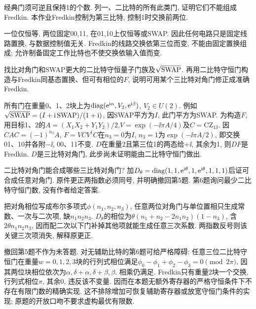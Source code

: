 \begin{exercise}经典门须可逆且保持1的个数. 列一、二比特的所有此类门, 证明它们不能组成Fredkin. 本作业Fredkin控制为第三比特, 控制1时交换前两位.\end{exercise}
\begin{solution}一位仅恒等, 两位固定00,11, 在01,10上仅恒等或SWAP. 因此任何电路只是固定线路置换, 与数据控制值无关. Fredkin的线路交换依第三位而变, 不能由固定置换组成; 允许制备固定工作比特也不使交换依输入值而变.
\end{solution}
\begin{exercise}找比对角门和SWAP更大的二比特守恒量子门族及$\sqrt{\rm SWAP}$. 再用二比特守恒门构造与Fredkin同基态置换、但可有相位的$F$, 说明可用某个三比特对角门修正成准确Fredkin.\end{exercise}
\begin{solution}所有门在重量0、1、2块上为$\operatorname{diag}(\mathrm e^{\mathrm i\alpha},V_2,\mathrm e^{\mathrm i\beta})$, $V_2\in U(2)$. 例如$\sqrt{\rm SWAP}=(I+\mathrm i\,\mathrm{SWAP})/(1+\mathrm i)$, 因SWAP平方为$I$, 此门平方为SWAP. 为构造$F$, 用目标1、2的$A=(X_1X_2+Y_1Y_2)/2$,$V=\exp(-\ii\pi A/4)$及$C=\mathrm{CZ}_{13}$. 因$CAC=(-1)^{n_3}A$, $F=VCV^\dagger C$在$n_3=0$为$I$, $n_3=1$为$\exp(-\ii\pi A/2)$, 即交换01、10并各附$-\ii$, 00、11不变. $D$在重量2且第三位1的两态给$+\ii$, 其余为1, 则$DF$是Fredkin. $D$是三比特对角门, 此步尚未证明能由二比特守恒门做出.
\end{solution}
\begin{exercise}二比特对角门能合成哪些三比特对角门? 加$D_\theta=\operatorname{diag}(1,1,\mathrm e^{\mathrm i\theta},1,\mathrm e^{\mathrm i\theta},1,1,1)$后证可合成任意对角门. 原件更正两指数必须同号, 并明确撤回第5题. 第6题询问最少二比特守恒门数, 没有作者给定答案.\end{exercise}
\begin{solution}把对角相位写成布尔多项式$\phi(n_1,n_2,n_3)$, 任意两位对角门与单位置相只生成常数、一次与二次项, 缺$n_1n_2n_3$. $D_\theta$的相位为$\theta(n_1+n_2-2n_1n_2)(1-n_3)$, 含$2\theta n_1n_2n_3$, 因而配二次以下门补掉其他项就能生成任意三次系数. 两指数反号则该关键三次项消失, 解释原更正.

撤回第5题不作为未答题. 对无辅助比特的第6题可给严格障碍: 任意三位二比特守恒门在重量$w=0,1,2,3$块的行列式相位满足$\phi_0-\phi_1+\phi_2-\phi_3=0\pmod{2\pi}$, 因其两位块相位依次为$\alpha,\delta+\alpha,\delta+\beta,\beta$. 相乘仍满足. Fredkin只有重量2块一个交换, 行列式相位$\pi$, 其余0, 违反该不变量. 因而在本题无额外寄存器的严格守恒条件下不存在有限门数的精确实现. 这不排除增加可恢复辅助寄存器或放宽守恒门条件的实现; 原题的开放口吻不要求虚构最优有限数.
\end{solution}
